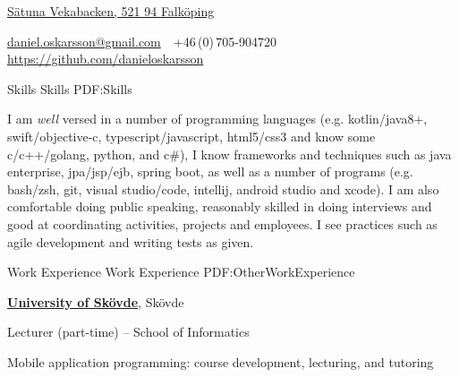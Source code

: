\documentclass[letterpaper,MMMyyyy,nonstopmode]{resume}
\newcommand{\CVAuthor}{Daniel Oskarsson}
\newcommand{\CVWebpage}{https://github.com/danieloskarsson}
\begin{document}

\Title{\CVAuthor}

\begin{SubTitle}
\href{https://www.google.com/maps/place/VEKABACKEN,+521+94+Falk%C3%B6ping/@58.3358392,13.7009896,12z/data=!4m5!3m4!1s0x465ae469d63424bf:0xb367c493ed2f945c!8m2!3d58.2692871!4d13.5626312}
{Sätuna Vekabacken, 521 94 Falköping}
\par
\href{mailto:daniel.oskarsson@gmail.com}
{daniel.oskarsson@gmail.com}
\,\SubBulletSymbol\,
+46\,(0)\,705-904720
\\
\href{\CVWebpage}
{\url{\CVWebpage}}
\end{SubTitle}

\begin{Body}


\Section
{Skills}
{Skills}
{PDF:Skills}

\Entry
I am \emph{well} versed in a number of programming languages (e.g. kotlin/java8+, swift/objective-c, typescript/javascript, html5/css3 and know some c/c++/golang, python, and c\#), I know frameworks and techniques such as java enterprise, jpa/jsp/ejb, spring boot, as well as a number of programs (e.g. bash/zsh, git, visual studio/code, intellij, android studio and xcode). I am also comfortable doing public speaking, reasonably skilled in doing interviews and good at coordinating activities, projects and employees. I see practices such as agile development and writing tests as given.


\Section
{Work Experience}
{Work Experience}
{PDF:OtherWorkExperience}

\Entry
\href{http://his.se}
{\textbf{University of Skövde}}, Skövde

\Gap
\BulletItem
Lecturer (part-time)
\hfill
{} --
\newline
School of Informatics
\begin{Detail}
\SubBulletItem
Mobile application programming: course development, lecturing, and tutoring
\end{Detail}

\begin{comment}
\Gap
\BulletItem
Student mentor (part-time)
\hfill
\DatestampYMD{2018}{09}{01} --
\DatestampYMD{2019}{07}{01}
\newline
Avdelningen för utbildnings- och studentstöd
\begin{Detail}
\SubBulletItem
Specifically requested by a student as their mentor
\end{Detail}


\end{comment}
\end{Body}
\end{document}
